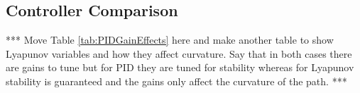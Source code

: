 \subsection{Controller Comparison}
\label{sec:controllerComparison}
*** Move Table \ref{tab:PIDGainEffects} here and make another table to show Lyapunov variables and how they affect curvature. Say that in both cases there are gains to tune but for PID they are tuned for stability whereas for Lyapunov stability is guaranteed and the gains only affect the curvature of the path. ***
